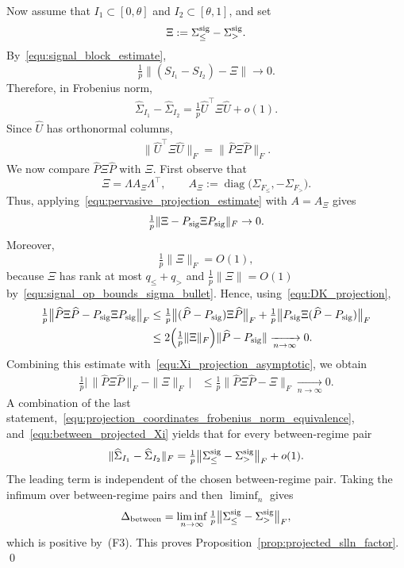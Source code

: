 \documentclass[10pt, letterpaper]{amsart}
\begin{document}
Now assume that $I_1\subset[0,\theta]$ and $I_2\subset[\theta,1]$, and set
\[
\Xi:=\Sigma_\le^{\rm sig}-\Sigma_>^{\rm sig}.
\]
By~\eqref{equ:signal_block_estimate},
\[
\tfrac1p\|(S_{I_1}-S_{I_2})-\Xi\|\to0.
\]
Therefore, in Frobenius norm,
\begin{align}\label{equ:between_projected_Xi}
\widehat\Sigma_{I_1}-\widehat\Sigma_{I_2}
=
\tfrac1p\widehat U^{\top}\Xi\widehat U+o(1).
\end{align}
Since $\widehat U$ has orthonormal columns,
\begin{align}
  \label{equ:projection_coordinates_frobenius_norm_equivalence}
  \|\widehat U^{\top}\Xi\widehat U\|_F
  =
  \|\widehat P\Xi\widehat P\|_F.
\end{align}
We now compare $\widehat P\Xi\widehat P$ with $\Xi$. First observe that
\[
\Xi=\Lambda A_\Xi\Lambda^{\top},
\qquad
A_\Xi:=
\operatorname{diag}\bigl(\Sigma_{F_\le},-\Sigma_{F_>}\bigr).
\]
Thus, applying~\eqref{equ:pervasive_projection_estimate} with $A=A_\Xi$ gives
\begin{align}\label{equ:Xi_projection_asymptotic}
\tfrac1p\|\Xi-P_{\rm sig}\Xi P_{\rm sig}\|_F\to0.
\end{align}
Moreover,
\[
\tfrac1p\|\Xi\|_F=O(1),
\]
because $\Xi$ has rank at most $q_\le+q_>$ and
$\tfrac1p\|\Xi\|=O(1)$ by~\eqref{equ:signal_op_bounds_sigma_bullet}. Hence, using~\eqref{equ:DK_projection},
\begin{align}
\tfrac1p
\bigl\|\widehat P\Xi\widehat P-P_{\rm sig}\Xi P_{\rm sig}\bigr\|_F
&\le
\tfrac1p
\bigl\|(\widehat P-P_{\rm sig})\Xi\widehat P\bigr\|_F
+
\tfrac1p
\bigl\|P_{\rm sig}\Xi(\widehat P-P_{\rm sig})\bigr\|_F\\
&\le
2\Bigl(\tfrac1p\|\Xi\|_F\Bigr)
\|\widehat P-P_{\rm sig}\|
\xrightarrow[n\to\infty]{}0.
\end{align}
Combining this estimate with~\eqref{equ:Xi_projection_asymptotic}, we obtain
\begin{align}
\tfrac1p
\bigl|\,
\|\widehat P\Xi\widehat P\|_F-\|\Xi\|_F
\,\bigr|
&\le
\tfrac1p
\|\widehat P\Xi\widehat P-\Xi\|_F
\xrightarrow[n\to\infty]{}0.
\end{align}
A combination of the last statement,~\eqref{equ:projection_coordinates_frobenius_norm_equivalence}, and~\eqref{equ:between_projected_Xi} yields that for every between-regime pair
\begin{align}
\|\widehat\Sigma_{I_1}-\widehat\Sigma_{I_2}\|_F
=
\tfrac1p
\bigl\|
\Sigma_\le^{\rm sig}-\Sigma_>^{\rm sig}
\bigr\|_F
+o(1).
\end{align}
The leading term is independent of the chosen between-regime pair. Taking the infimum over between-regime pairs and then $\liminf_n$ gives
\begin{align}
\Delta_{\textup{between}}
=
\liminf_{n\to\infty}
\tfrac1p
\bigl\|
\Sigma_\le^{\rm sig}-\Sigma_>^{\rm sig}
\bigr\|_F,
\end{align}
which is positive by~(F3). This proves Proposition~\ref{prop:projected_slln_factor}. \qed
\end{document}
